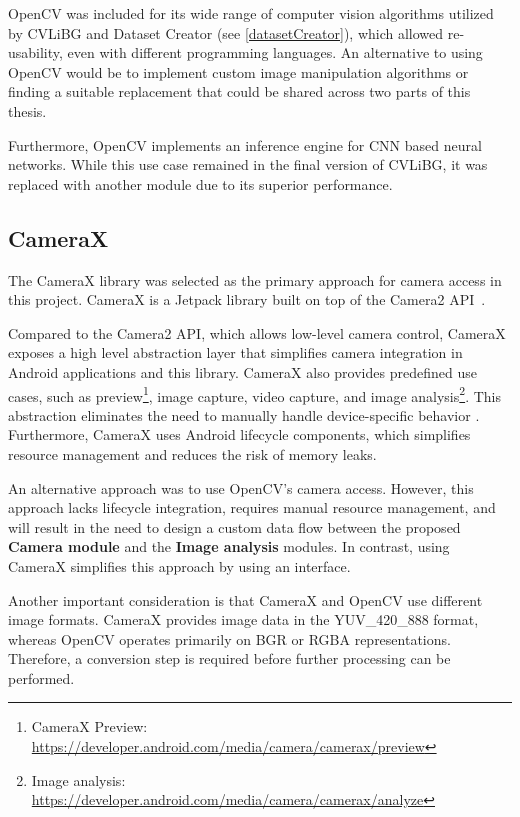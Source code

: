 OpenCV was included for its wide range of computer vision algorithms utilized by CVLiBG and Dataset Creator (see \ref{datasetCreator}), which allowed re-usability, even with different programming languages. An alternative to using OpenCV would be to implement custom image manipulation algorithms or finding a suitable replacement that could be shared across two parts of this thesis. 

Furthermore, OpenCV implements an inference engine for CNN based neural networks. While this use case remained in the final version of CVLiBG, it was replaced with another module due to its superior performance.


\subsection{CameraX}
\label{cameraX}
The CameraX library was selected as the primary approach for camera access in this project. CameraX is a Jetpack library built on top of the Camera2 API~\cite{cameraXApi}. 

Compared to the Camera2 API, which allows low-level camera control, CameraX exposes a high level abstraction layer that simplifies camera integration in Android applications and this library. CameraX also provides predefined use cases, such as
preview\footnote{CameraX Preview: \url{https://developer.android.com/media/camera/camerax/preview}}, 
image capture, video capture, 
and image analysis\footnote{Image analysis: \url{https://developer.android.com/media/camera/camerax/analyze}}.
This abstraction eliminates the need to manually handle device-specific behavior \cite{cameraXApi}. Furthermore, CameraX uses Android lifecycle components, which simplifies resource management and reduces the risk of memory leaks.

An alternative approach was to use OpenCV's camera access. However, this approach lacks lifecycle integration, requires manual resource management, and will result in the need to design a custom data flow between the proposed \textbf{Camera module} and the \textbf{Image analysis} modules. In contrast, using CameraX simplifies this approach by using an interface.

Another important consideration is that CameraX and OpenCV use different image formats.
CameraX provides image data in the YUV\_420\_888 format, whereas OpenCV operates primarily on BGR or RGBA representations. Therefore, a conversion step is required before further processing can be performed.

